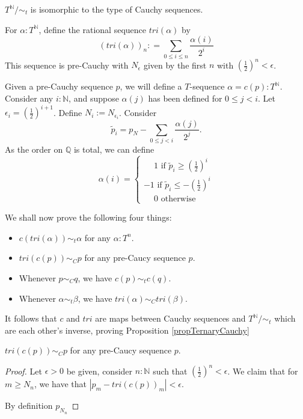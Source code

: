 \begin{proposition}\label{propTernaryCauchy}
  $T^\mathbb N/ \sim_t$ is isomorphic to the type of Cauchy sequences. 
\end{proposition} 
\begin{definition}%
  For $\alpha: T^\mathbb N$, define the rational sequence $tri(\alpha)$ by 
  \begin{equation} (tri(\alpha))_n :  = \sum\limits_{0 \leq i \leq n} \frac{\alpha(i)} { 2^{i}} \end{equation}  
  This sequence is pre-Cauchy with $N_\epsilon$ given by the first $n$ with $(\frac12)^n<\epsilon$. 
\end{definition}  
%
\begin{definition}
  Given a pre-Cauchy sequence $p$, 
  we will define a $T$-sequence $\alpha  = c(p): T^\mathbb N$.
  Consider any $i:\mathbb N$, and suppose $\alpha(j)$ has been defined for $0 \leq j<i$. 
%
  Let $\epsilon_i = (\frac12)^{i+1}$. %
  Define $N_i:= N_{\epsilon_i}$. %
%
  Consider 
  \begin{equation}
    \widetilde p_i = p_N - \sum\limits_{0\leq j < i} \frac {\alpha(j)}{2^{j}}.
  \end{equation}
  As the order on $\mathbb Q$ is total, we can define 
  \begin{equation}
    \alpha(i) = \begin{cases}
    \phantom{-} 1  \text{ if } \widetilde p_i \geq    (\frac12)^{i} \\
    -1             \text{ if } \widetilde p_i \leq  - (\frac12)^{i} \\
    \phantom{-} 0 \text{ otherwise } 
    \end{cases} 
  \end{equation}  
\end{definition} 
We shall now prove the following four things: 
\begin{itemize}
  \item 
    $c(tri(\alpha)) \sim_t \alpha$ for any $\alpha: T^n$.
  \item 
    $tri(c(p)) \sim_C p$ for any pre-Caucy sequence $p$. 
  \item 
    Whenever $p \sim_C q$, we have $c(p)\sim_t c(q)$. 
  \item 
    Whenever $\alpha \sim_t \beta$, we have $tri(\alpha) \sim_C tri(\beta)$. 
\end{itemize}
It follows that $c$ and $tri$ are maps between Cauchy sequences and $T^\mathbb N /\sim_t$ 
which are each other's inverse, proving Proposition \ref{propTernaryCauchy}
\begin{lemma} $tri(c(p)) \sim_C p$ for any pre-Caucy sequence $p$. 
\end{lemma} 



\begin{proof}
  Let $\epsilon>0$ be given, consider $n:\mathbb N$ such that
  $(\frac12)^n < \epsilon$. 
  We claim that for $m\geq N_n$, we have that $|p_m- tri(c(p))_m| < \epsilon$. 

  By definition $p_{N_n} $  
\end{proof} 





